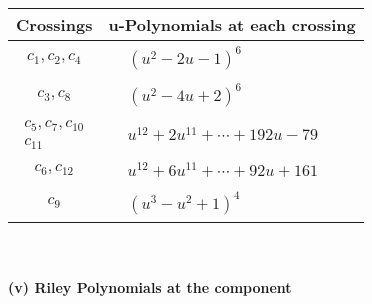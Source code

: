 \documentclass[1p]{elsarticle_modified}
\theoremstyle{definition}
\begin{document}
\begin{tabular}{m{50pt}|m{274pt}}
Crossings & \hspace{64pt}u-Polynomials at each crossing \\
\hline $$\begin{aligned}c_{1},c_{2},c_{4}\end{aligned}$$&$\begin{aligned}
&(u^2-2 u-1)^6
\end{aligned}$\\
\hline $$\begin{aligned}c_{3},c_{8}\end{aligned}$$&$\begin{aligned}
&(u^2-4 u+2)^6
\end{aligned}$\\
\hline $$\begin{aligned}c_{5},c_{7},c_{10}\\c_{11}\end{aligned}$$&$\begin{aligned}
&u^{12}+2 u^{11}+\cdots+192 u-79
\end{aligned}$\\
\hline $$\begin{aligned}c_{6},c_{12}\end{aligned}$$&$\begin{aligned}
&u^{12}+6 u^{11}+\cdots+92 u+161
\end{aligned}$\\
\hline $$\begin{aligned}c_{9}\end{aligned}$$&$\begin{aligned}
&(u^3- u^2+1)^4
\end{aligned}$\\
\hline
\end{tabular}\\~\\
\newpage\renewcommand{\arraystretch}{1}
\flushleft \textbf{(v) Riley Polynomials at the component}\newline \\
\end{document}
